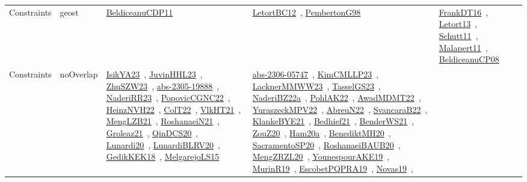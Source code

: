 {\begin{longtable}{lp{3cm}>{\raggedright\arraybackslash}p{6cm}>{\raggedright\arraybackslash}p{6cm}>{\raggedright\arraybackslash}p{8cm}}
Constraints & geost & \href{../works/BeldiceanuCDP11.pdf}{BeldiceanuCDP11}~\cite{BeldiceanuCDP11} & \href{../works/LetortBC12.pdf}{LetortBC12}~\cite{LetortBC12}, \href{../works/PembertonG98.pdf}{PembertonG98}~\cite{PembertonG98} & \href{../works/FrankDT16.pdf}{FrankDT16}~\cite{FrankDT16}, \href{../works/Letort13.pdf}{Letort13}~\cite{Letort13}, \href{../works/Schutt11.pdf}{Schutt11}~\cite{Schutt11}, \href{../works/Malapert11.pdf}{Malapert11}~\cite{Malapert11}, \href{../works/BeldiceanuCP08.pdf}{BeldiceanuCP08}~\cite{BeldiceanuCP08}\\
Constraints & noOverlap & \href{../works/IsikYA23.pdf}{IsikYA23}~\cite{IsikYA23}, \href{../works/JuvinHHL23.pdf}{JuvinHHL23}~\cite{JuvinHHL23}, \href{../works/ZhuSZW23.pdf}{ZhuSZW23}~\cite{ZhuSZW23}, \href{../works/abs-2305-19888.pdf}{abs-2305-19888}~\cite{abs-2305-19888}, \href{../works/NaderiRR23.pdf}{NaderiRR23}~\cite{NaderiRR23}, \href{../works/PopovicCGNC22.pdf}{PopovicCGNC22}~\cite{PopovicCGNC22}, \href{../works/HeinzNVH22.pdf}{HeinzNVH22}~\cite{HeinzNVH22}, \href{../works/ColT22.pdf}{ColT22}~\cite{ColT22}, \href{../works/VlkHT21.pdf}{VlkHT21}~\cite{VlkHT21}, \href{../works/MengLZB21.pdf}{MengLZB21}~\cite{MengLZB21}, \href{../works/RoshanaeiN21.pdf}{RoshanaeiN21}~\cite{RoshanaeiN21}, \href{../works/Groleaz21.pdf}{Groleaz21}~\cite{Groleaz21}, \href{../works/QinDCS20.pdf}{QinDCS20}~\cite{QinDCS20}, \href{../works/Lunardi20.pdf}{Lunardi20}~\cite{Lunardi20}, \href{../works/LunardiBLRV20.pdf}{LunardiBLRV20}~\cite{LunardiBLRV20}, \href{../works/GedikKEK18.pdf}{GedikKEK18}~\cite{GedikKEK18}, \href{../works/MelgarejoLS15.pdf}{MelgarejoLS15}~\cite{MelgarejoLS15} & \href{../works/abs-2306-05747.pdf}{abs-2306-05747}~\cite{abs-2306-05747}, \href{../works/KimCMLLP23.pdf}{KimCMLLP23}~\cite{KimCMLLP23}, \href{../works/LacknerMMWW23.pdf}{LacknerMMWW23}~\cite{LacknerMMWW23}, \href{../works/TasselGS23.pdf}{TasselGS23}~\cite{TasselGS23}, \href{../works/NaderiBZ22a.pdf}{NaderiBZ22a}~\cite{NaderiBZ22a}, \href{../works/PohlAK22.pdf}{PohlAK22}~\cite{PohlAK22}, \href{../works/AwadMDMT22.pdf}{AwadMDMT22}~\cite{AwadMDMT22}, \href{../works/YuraszeckMPV22.pdf}{YuraszeckMPV22}~\cite{YuraszeckMPV22}, \href{../works/AbreuN22.pdf}{AbreuN22}~\cite{AbreuN22}, \href{../works/SvancaraB22.pdf}{SvancaraB22}~\cite{SvancaraB22}, \href{../works/KlankeBYE21.pdf}{KlankeBYE21}~\cite{KlankeBYE21}, \href{../works/Bedhief21.pdf}{Bedhief21}~\cite{Bedhief21}, \href{../works/BenderWS21.pdf}{BenderWS21}~\cite{BenderWS21}, \href{../works/ZouZ20.pdf}{ZouZ20}~\cite{ZouZ20}, \href{../works/Ham20a.pdf}{Ham20a}~\cite{Ham20a}, \href{../works/BenediktMH20.pdf}{BenediktMH20}~\cite{BenediktMH20}, \href{../works/SacramentoSP20.pdf}{SacramentoSP20}~\cite{SacramentoSP20}, \href{../works/RoshanaeiBAUB20.pdf}{RoshanaeiBAUB20}~\cite{RoshanaeiBAUB20}, \href{../works/MengZRZL20.pdf}{MengZRZL20}~\cite{MengZRZL20}, \href{../works/YounespourAKE19.pdf}{YounespourAKE19}~\cite{YounespourAKE19}, \href{../works/MurinR19.pdf}{MurinR19}~\cite{MurinR19}, \href{../works/EscobetPQPRA19.pdf}{EscobetPQPRA19}~\cite{EscobetPQPRA19}, \href{../works/Novas19.pdf}{Novas19}~\cite{Novas19}, 
\end{longtable}}

